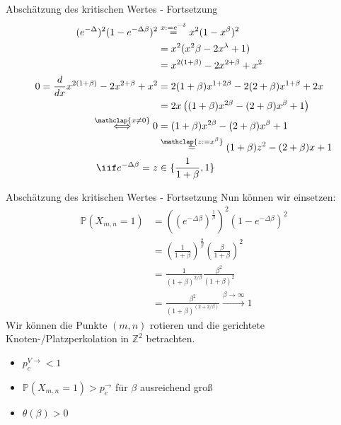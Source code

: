 \documentclass[11pt]{beamer}
\begin{document}
\begin{frame}{Absch\"atzung des kritischen Wertes - Fortsetzung}
    \begin{align*}
        (e^{-\Delta})^2(1 - e^{-\Delta\beta})^2 &\overset{x := e^{-\delta}}{=} 
            x^2(1 - x^\beta)^2 \\
            &= x^2(x^2\beta - 2 x^\lambda + 1) \\
            &= x^{2(1 + \beta)} - 2x^{2 + \beta} + x^2 \\
            0 = \frac{d}{dx} x^{2(1 + \beta)} - 2x^{2 + \beta} + x^2 
            &= 2(1 + \beta) x^{1 + 2\beta} - 2(2 + \beta)x^{1 + \beta} + 2x \\
            &= 2x\left( (1 + \beta)x^{2\beta} - (2 + \beta)x^\beta + 1 \right) \\
       \overset{\mathclap{x \not= 0}}{\iff } 0 &= ( 1 + \beta) x^{2\beta} - ( 2 + \beta)x^\beta + 1 \\
            &\overset{\mathclap{z:= x^\beta}}{=} (1 + \beta) z^2 - (2 + \beta)x + 1\\
            \iif e^{-\Delta\beta} = z &\in \{ \frac{1}{1 + \beta}, 1 \}
    \end{align*}
\end{frame}

\begin{frame}{Absch\"atzung des kritischen Wertes - Fortsetzung}
    Nun können wir einsetzen:
    \begin{align*}
        \mathbb{P}(X_{m, n} = 1) &= ((e^{-\Delta\beta})^{\frac{1}{\beta}})^2(1 - e^{-\Delta\beta})^2 \\
                                 &= \left(\frac{1}{1 + \beta}\right)^\frac{2}{\beta}\left(\frac{\beta}{1 + \beta}\right)^2 \\
                                 &= \frac{1}{(1 + \beta)^{2/\beta}}\frac{\beta^2}{(1 + \beta)^2} \\
                                 &= \frac{\beta^2}{(1 + \beta)^{(2 + 2/\beta)}} \overset{\beta \to \infty}{\to} 1
    \end{align*}
    Wir können die Punkte $(m, n)$ rotieren und die gerichtete Knoten-/Platzperkolation in $\mathbb{Z}^2$ betrachten. 
    \begin{itemize}
        \item $p_c^{V\to} < 1$ 
        \item $\mathbb{P}(X_{m, n} = 1) > p_c^\to$ f\"ur $\beta$ ausreichend groß
        \item $\theta(\beta) > 0$
    \end{itemize}
\end{frame}
\end{document}
